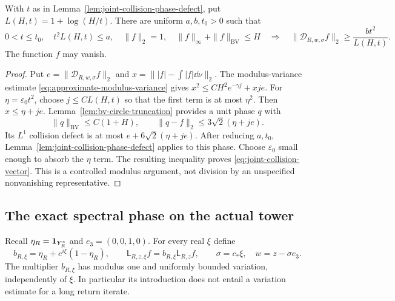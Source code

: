 \begin{proposition}
\label{prop:joint-collision-vector-defect}
With $t$ as in Lemma~\ref{lem:joint-collision-phase-defect}, put
$L(H,t)=1+\log(H/t)$. There are uniform $a,b,t_0>0$ such that
\begin{equation}\label{eq:joint-collision-vector}
 0<t\le t_0,\quad t^2L(H,t)\le a,
 \quad \|f\|_2=1,\quad
 \|f\|_\infty+\|f\|_{\mathrm{BV}}\le H
 \quad\Longrightarrow\quad
 \|\mathcal D_{R,w,\sigma}f\|_2\ge\frac{bt^2}{L(H,t)}.
\end{equation}
The function $f$ may vanish.
\end{proposition}
\begin{proof}
Put $e=\|\mathcal D_{R,w,\sigma}f\|_2$ and
$x=\||f|-\int|f|\dd\nu\|_2$. The modulus-variance estimate
\eqref{eq:approximate-modulus-variance} gives
$x^2\le C H^2e^{-\gamma j}+xje$.
For $\eta=\varepsilon_0t^2$, choose $j\le C L(H,t)$ so that the
first term is at most $\eta^2$. Then $x\le\eta+je$.
Lemma~\ref{lem:bv-circle-truncation} provides a unit phase $q$ with
\[
 \|q\|_{\mathrm{BV}}\le C(1+H),\qquad
 \|q-f\|_2\le3\sqrt2(\eta+je).
\]
Its $L^1$ collision defect is at most $e+6\sqrt2(\eta+je)$.
After reducing $a,t_0$, Lemma~\ref{lem:joint-collision-phase-defect}
applies to this phase. Choose $\varepsilon_0$ small enough to absorb
the $\eta$ term. The resulting inequality proves
\eqref{eq:joint-collision-vector}. This is a controlled modulus
argument, not division by an unspecified nonvanishing representative.
\end{proof}

\subsection{The exact spectral phase on the actual tower}
Recall $\eta_R=\mathbf1_{Y_R^*}$ and $e_3=(0,0,1,0)$.
For every real $\xi$ define
\begin{equation}\label{eq:peripheral-lift-definition}
 b_{R,\xi}=\eta_R+e^{i\xi}(1-\eta_R),\qquad
 \mathsf L_{R,z,\xi}f=b_{R,\xi}\mathsf L_{R,z}f,
 \qquad \sigma=c_*\xi,\quad w=z-\sigma e_3.
\end{equation}
The multiplier $b_{R,\xi}$ has modulus one and uniformly bounded
variation, independently of $\xi$. In particular its introduction
does not entail a variation estimate for a long return iterate.

